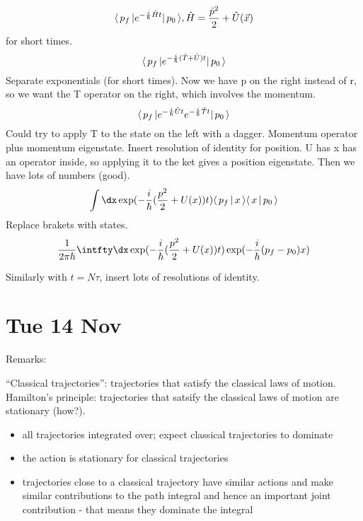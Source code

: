 \documentclass[a4paper]{extarticle}
\newcommand{\ihbar}{\frac{i}{\hbar}}
\begin{document}
\begin{equation}
  \bra{p_f} e^{-\ihbar \hat{H} t} \ket{p_0},
  \hat{H} = \frac{\hat{p}^2}{2} + \hat{U}(\vec{x})
\end{equation}
for short times.
\begin{equation}
  \bra{p_f} e^{-\ihbar (\hat{T} + \hat{U}) t} \ket{p_0}
\end{equation}
Separate exponentials (for short times).
Now we have p on the right instead of r, so we want the T operator on the right,
which involves the momentum.
\begin{equation}
  \bra{p_f} e^{-\ihbar \hat{U} t} e^{-\ihbar \hat{T} t} \ket{p_0}
\end{equation}
Could try to apply T to the state on the left with a dagger.
Momentum operator plus momentum eigenstate.
Insert resolution of identity for position.
U has x has an operator inside, so applying it to the ket gives a position eigenstate.
Then we have lots of numbers (good).
\begin{equation}
  \int \dx \exp(-\ihbar ( \frac{p^2}{2} + U(x)) t) \braket{p_f}{x} \braket{x}{p_0}
\end{equation}
Replace brakets with states.
\begin{equation}
  \frac{1}{2\pi\hbar} \intfty\dx
  \exp(-\ihbar ( \frac{p^2}{2} + U(x)) t) \exp(-\frac{i}{\hbar} (p_f - p_0) x)
\end{equation}

Similarly with $t = N\tau$, insert lots of resolutions of identity.

\section{Tue 14 Nov}

Remarks:

``Classical trajectories'': trajectories that satisfy the classical laws of motion.
Hamilton's principle: trajectories that satsify the classical laws of motion
are stationary (how?).

\begin{itemize}
  \item all trajectories integrated over; expect classical trajectories to dominate
  \item the action is stationary for classical trajectories
  \item trajectories close to a classical trajectory have similar actions and
        make similar contributions to the path integral and hence an important
        joint contribution - that means they dominate the integral
\end{itemize}
\end{document}
